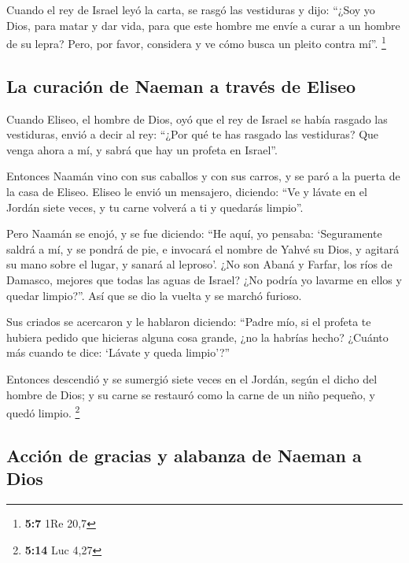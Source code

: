  Cuando el rey de Israel leyó la carta, se rasgó las
vestiduras y dijo: ``¿Soy yo Dios, para matar y dar vida, para que este
hombre me envíe a curar a un hombre de su lepra? Pero, por favor,
considera y ve cómo busca un pleito contra mí''. \footnote{\textbf{5:7}
  1Re 20,7}

\hypertarget{la-curaciuxf3n-de-naeman-a-travuxe9s-de-eliseo}{%
\subsection{La curación de Naeman a través de
Eliseo}\label{la-curaciuxf3n-de-naeman-a-travuxe9s-de-eliseo}}

 Cuando Eliseo, el hombre de Dios, oyó que el rey de
Israel se había rasgado las vestiduras, envió a decir al rey: ``¿Por qué
te has rasgado las vestiduras? Que venga ahora a mí, y sabrá que hay un
profeta en Israel''.

 Entonces Naamán vino con sus caballos y con sus carros, y
se paró a la puerta de la casa de Eliseo.  Eliseo le
envió un mensajero, diciendo: ``Ve y lávate en el Jordán siete veces, y
tu carne volverá a ti y quedarás limpio''.

 Pero Naamán se enojó, y se fue diciendo: ``He aquí, yo
pensaba: `Seguramente saldrá a mí, y se pondrá de pie, e invocará el
nombre de Yahvé su Dios, y agitará su mano sobre el lugar, y sanará al
leproso'.  ¿No son Abaná y Farfar, los ríos de Damasco,
mejores que todas las aguas de Israel? ¿No podría yo lavarme en ellos y
quedar limpio?''. Así que se dio la vuelta y se marchó furioso.

 Sus criados se acercaron y le hablaron diciendo: ``Padre
mío, si el profeta te hubiera pedido que hicieras alguna cosa grande,
¿no la habrías hecho? ¿Cuánto más cuando te dice: `Lávate y queda
limpio'?''

 Entonces descendió y se sumergió siete veces en el
Jordán, según el dicho del hombre de Dios; y su carne se restauró como
la carne de un niño pequeño, y quedó limpio. \footnote{\textbf{5:14} Luc
  4,27}

\hypertarget{acciuxf3n-de-gracias-y-alabanza-de-naeman-a-dios}{%
\subsection{Acción de gracias y alabanza de Naeman a
Dios}\label{acciuxf3n-de-gracias-y-alabanza-de-naeman-a-dios}}

